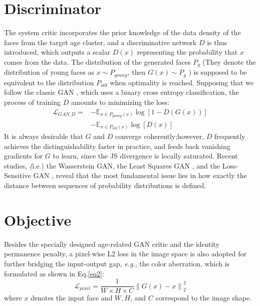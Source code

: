 \documentclass[10pt,twocolumn,letterpaper]{article}
\begin{document}
\section{Discriminator}
The system critic incorporates the prior knowledge of the
data density of the faces from the target age cluster, and
a discriminative network $D$ is thus introduced, which 
outputs a scalar $D\left(x\right)$ representing the probability that $x$ comes from the data. The distribution of the generated faces $P_g$
(They denote the distribution of young faces as $x \sim P_{young}$,
then $G\left(x\right)\sim P_g$ ) is supposed to be equivalent to the 
distribution $P_{old}$ when optimality is reached. Supposing that
we follow the classic GAN \cite{goodfellow2014generative}, which uses a binary cross
entropy classification, the process of training $D$ amounts to
minimizing the loss:
\begin{equation}
   \begin{aligned}
	\mathcal{L}_{GAN\_D} = &-\mathbb{E}_{x\in P_{young}\left(x\right)}\log\left[1-D\left(G\left(x\right)\right)\right]\\&-\mathbb{E}_{x\in P_{old}\left(x\right)}\log\left[D\left(x\right)\right]
	\end{aligned}
\end{equation}
It is always desirable that $G$ and $D$ converge coherently;however, $D$ frequently achieves the distinguishability faster
in practice, and feeds back vanishing gradients for $G$ to
learn, since the JS divergence is locally saturated. Recent
studies, \textit(i.e.) the Wasserstein GAN, the Least Squares
GAN \cite{mao2017least}, and the Loss-Sensitive GAN \cite{qi2017loss}, reveal that
the most fundamental issue lies in how exactly the distance
between sequences of probability distributions is defined.
\section{Objective}
Besides the specially designed age-related GAN critic
and the identity permanence penalty, a pixel-wise L2 loss
in the image space is also adopted for further bridging the
input-output gap, \textit{e.g.}, the color aberration, which is formulated as shown in Eq.\ref{eq2}:
\begin{equation}
\mathcal{L}_{pixel}= \frac{1}{W\times H\times C} {\left \|G\left(x\right)-x  \right \|}_2^2
	\label{eq2}
\end{equation}
where $x$ denotes the input face and $W, H$, and $C$ correspond to the image shape.
{\small
	
	
}
\end{document}
